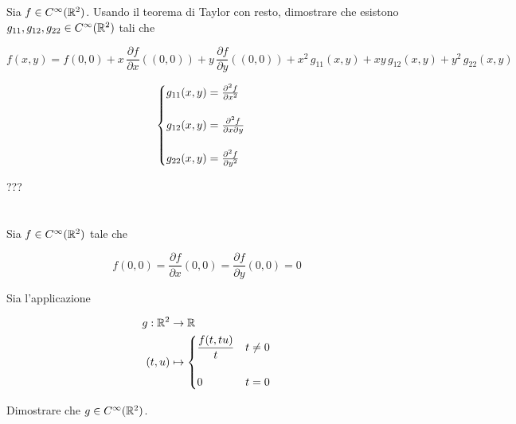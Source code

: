 \begin{tcolorbox}
	Sia $ f \in C^{\infty}(\mathbb{R}^{2}) $. Usando il teorema di Taylor con resto, dimostrare che esistono $ g_{11},g_{12},g_{22} \in C^{\infty}(\mathbb{R}^{2}) $ tali che
	
	\begin{equation}
		f(x,y) = f(0,0) + x \, \dfrac{\partial f}{\partial x} ((0,0)) + y \, \dfrac{\partial f}{\partial y} ((0,0)) + x^{2} \, g_{11}(x,y) + x y \, g_{12}(x,y) + y^{2} \, g_{22}(x,y)
	\end{equation}
\end{tcolorbox}

\begin{equation}
	\begin{cases}
		g_{11}(x,y) = \pdv[2]{f}{x} (0,0)\\\\
		g_{12}(x,y) = \pdv{f}{x}{y} (0,0)\\\\
		g_{22}(x,y) = \pdv[2]{f}{y} (0,0)
	\end{cases}
\end{equation}

???

\tocless\section{}\label{es1-6}

\begin{tcolorbox}
	Sia $ f \in C^{\infty}(\mathbb{R}^{2}) $ tale che
	
	\begin{equation}
		f(0,0) = \dfrac{\partial f}{\partial x} (0,0) = \dfrac{\partial f}{\partial y} (0,0) = 0
	\end{equation}

	Sia l'applicazione
	
	\begin{align}
		\begin{split}
			g : \R^{2} & \to \R\\
			(t,u) &\mapsto%
			\begin{cases}
				\dfrac{f(t,tu)}{t} & t \neq 0\\\\
				0 & t = 0
			\end{cases}
		\end{split}
	\end{align}
	
	Dimostrare che $ g \in C^{\infty}(\mathbb{R}^{2}) $.
\end{tcolorbox}

